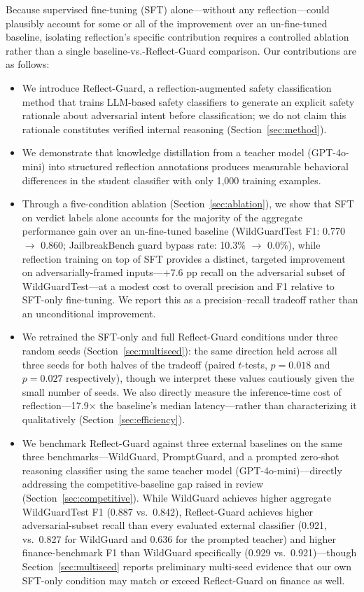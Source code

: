 \documentclass[superintelligence,article,submit,pdftex,moreauthors]{Definitions/mdpi}
\begin{document}
Because supervised fine-tuning (SFT) alone---without any reflection---could plausibly account for some or all of the improvement over an un-fine-tuned baseline, isolating reflection's specific contribution requires a controlled ablation rather than a single baseline-vs.-Reflect-Guard comparison. Our contributions are as follows:
\begin{itemize}[leftmargin=*, nosep]
  \item We introduce Reflect-Guard, a reflection-augmented safety classification method that trains LLM-based safety classifiers to generate an explicit safety rationale about adversarial intent before classification; we do not claim this rationale constitutes verified internal reasoning (Section~\ref{sec:method}).
  \item We demonstrate that knowledge distillation from a teacher model (GPT-4o-mini) into structured reflection annotations produces measurable behavioral differences in the student classifier with only 1{,}000 training examples.
  \item Through a five-condition ablation (Section~\ref{sec:ablation}), we show that SFT on verdict labels alone accounts for the majority of the aggregate performance gain over an un-fine-tuned baseline (WildGuardTest F1: 0.770 $\to$ 0.860; JailbreakBench guard bypass rate: 10.3\% $\to$ 0.0\%), while reflection training on top of SFT provides a distinct, targeted improvement on adversarially-framed inputs---+7.6 pp recall on the adversarial subset of WildGuardTest---at a modest cost to overall precision and F1 relative to SFT-only fine-tuning. We report this as a precision--recall tradeoff rather than an unconditional improvement.
  \item We retrained the SFT-only and full Reflect-Guard conditions under three random seeds (Section~\ref{sec:multiseed}): the same direction held across all three seeds for both halves of the tradeoff (paired $t$-tests, $p=0.018$ and $p=0.027$ respectively), though we interpret these values cautiously given the small number of seeds. We also directly measure the inference-time cost of reflection---17.9$\times$ the baseline's median latency---rather than characterizing it qualitatively (Section~\ref{sec:efficiency}).
  \item We benchmark Reflect-Guard against three external baselines on the same three benchmarks---WildGuard, PromptGuard, and a prompted zero-shot reasoning classifier using the same teacher model (GPT-4o-mini)---directly addressing the competitive-baseline gap raised in review (Section~\ref{sec:competitive}). While WildGuard achieves higher aggregate WildGuardTest F1 (0.887 vs.\ 0.842), Reflect-Guard achieves higher adversarial-subset recall than every evaluated external classifier (0.921, vs.\ 0.827 for WildGuard and 0.636 for the prompted teacher) and higher finance-benchmark F1 than WildGuard specifically (0.929 vs.\ 0.921)---though Section~\ref{sec:multiseed} reports preliminary multi-seed evidence that our own SFT-only condition may match or exceed Reflect-Guard on finance as well.
\end{itemize}
\end{document}
